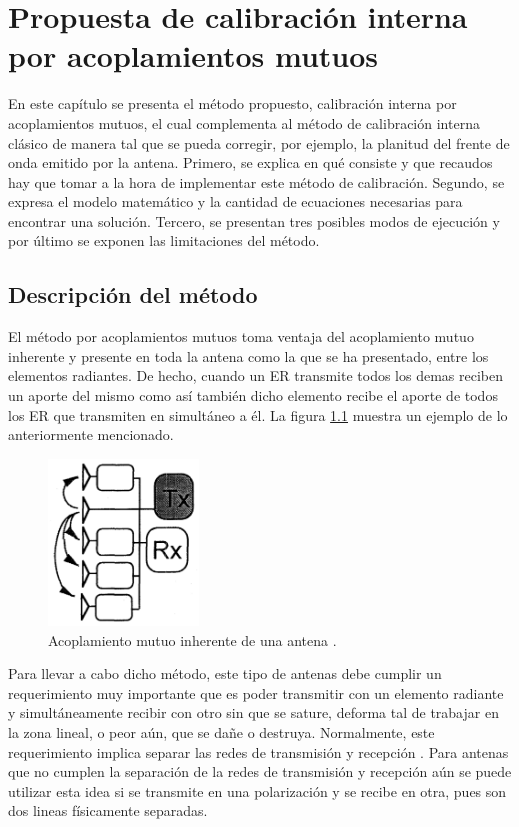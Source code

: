 \chapter{Propuesta de calibración interna por acoplamientos mutuos}
\label{ch:mutualCalibration}

En este capítulo se presenta el método propuesto, calibración interna por acoplamientos mutuos, el cual complementa al método de
calibración interna clásico de manera tal que se pueda corregir, por ejemplo, la planitud del frente de onda emitido por la
antena. Primero, se explica en qué consiste y que recaudos hay que tomar a la hora de implementar este método de calibración.
Segundo, se expresa el modelo matemático y la cantidad de ecuaciones necesarias para encontrar una solución. Tercero, se
presentan tres posibles modos de ejecución y por último se exponen las limitaciones del método.  


\section{Descripción del método}

El método por acoplamientos mutuos toma ventaja del acoplamiento mutuo inherente y presente en toda la antena como la que se ha
presentado, entre los elementos radiantes. De hecho, cuando un ER transmite todos los demas reciben un aporte del mismo como así
también dicho elemento recibe el aporte de todos los ER que transmiten en simultáneo a él. La figura \ref{fig:mutualCoupling1}
muestra un ejemplo de lo anteriormente mencionado.

\begin{figure}[H]
 \centering
 \includegraphics[width=4cm]{gfx/mutualCoupling1.png}
 \caption{Acoplamiento mutuo inherente de una antena \cite{Hara1997}.}
 \label{fig:mutualCoupling1}
\end{figure}

Para llevar a cabo dicho método, este tipo de antenas debe cumplir un requerimiento muy importante que es poder transmitir con
un elemento radiante y simultáneamente recibir con otro sin que se sature, deforma tal de trabajar en la zona lineal, o peor
aún, que se dañe o destruya. Normalmente, este requerimiento implica separar las redes de transmisión y recepción
\cite{Gao2001}. Para antenas que no cumplen la separación de la redes de transmisión y recepción aún se puede utilizar esta
idea si se transmite en una polarización y se recibe en otra, pues son dos lineas físicamente separadas.

